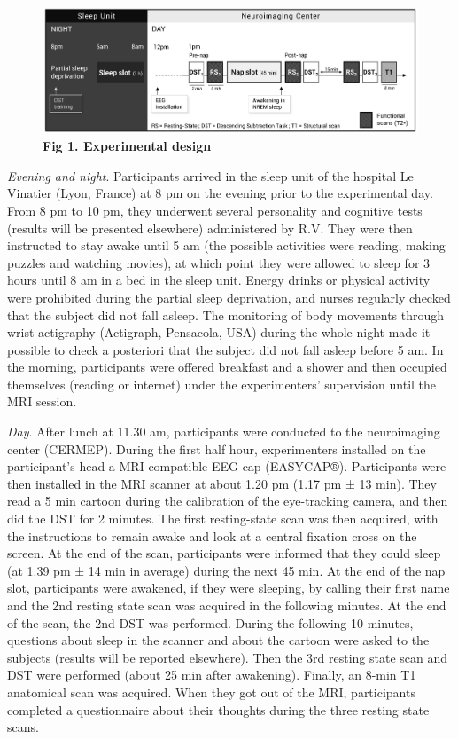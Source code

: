 \begin{figure}[htb]
	\includegraphics[width=\textwidth]{Fig/Results/Inertia/Inertia/Fig1_Protocol.png}
	\caption*{\textbf{Fig 1. Experimental design}}
\end{figure}

\emph{Evening and night}. Participants arrived in the sleep unit of the hospital Le Vinatier (Lyon, France) at 8 pm on the evening prior to the experimental day. From 8 pm to 10 pm, they underwent several personality and cognitive tests (results will be presented elsewhere) administered by R.V. They were then instructed to stay awake until 5 am (the possible activities were reading, making puzzles and watching movies), at which point they were allowed to sleep for 3 hours until 8 am in a bed in the sleep unit. Energy drinks or physical activity were prohibited during the partial sleep deprivation, and nurses regularly checked that the subject did not fall asleep. The monitoring of body movements through wrist actigraphy (Actigraph, Pensacola, USA) during the whole night made it possible to check a posteriori that the subject did not fall asleep before 5 am. In the morning, participants were offered breakfast and a shower and then occupied themselves (reading or internet) under the experimenters’ supervision until the MRI session.

\emph{Day}. After lunch at 11.30 am, participants were conducted to the neuroimaging center (CERMEP). During the first half hour, experimenters installed on the participant’s head a MRI compatible EEG cap (EASYCAP®). Participants were then installed in the MRI scanner at about 1.20 pm (1.17 pm ± 13 min). They read a 5 min cartoon during the calibration of the eye-tracking camera, and then did the DST for 2 minutes. The first resting-state scan was then acquired, with the instructions to remain awake and look at a central fixation cross on the screen. At the end of the scan, participants were informed that they could sleep (at 1.39 pm ± 14 min in average) during the next 45 min. At the end of the nap slot, participants were awakened, if they were sleeping, by calling their first name and the 2nd resting state scan was acquired in the following minutes. At the end of the scan, the 2nd DST was performed. During the following 10 minutes, questions about sleep in the scanner and about the cartoon were asked to the subjects (results will be reported elsewhere). Then the 3rd resting state scan and DST were performed (about 25 min after awakening). Finally, an 8-min T1 anatomical scan was acquired. When they got out of the MRI, participants completed a questionnaire about their thoughts during the three resting state scans.

